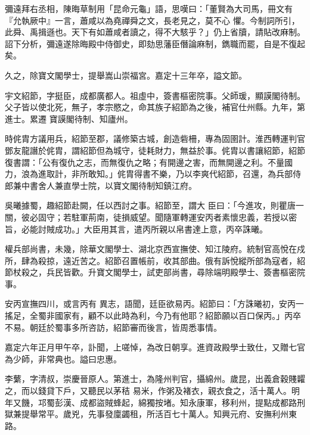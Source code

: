 \begin{pinyinscope}
 彌遠拜右丞相，陳晦草制用「昆命元龜」語，思嘆曰：「董賢為大司馬，冊文有『允執厥中』一言，蕭咸以為堯禪舜之文，長老見之，莫不心
 懼。今制詞所引，此舜、禹揖遜也。天下有如蕭咸者讀之，得不大駭乎？」仍上省牘，請貼改麻制。詔下分析，彌遠遂除晦殿中侍御史，即劾思藩臣僭論麻制，鐫職而罷，自是不復起矣。



 久之，除寶文閣學士，提舉嵩山崇福宮。嘉定十三年卒，謚文節。



 宇文紹節，字挺臣，成都廣都人。祖虛中，簽書樞密院事。父師瑗，顯謨閣待制。父子皆以使北死，無子，孝宗愍之，命其族子紹節為之後，補官仕州縣。九年，第進士。累遷
 寶謨閣待制、知廬州。



 時侂胄方議用兵，紹節至郡，議修築古城，創造砦柵，專為固圉計。淮西轉運判官鄧友龍譖於侂胄，謂紹節但為城守，徒耗財力，無益於事。侂胄以書讓紹節，紹節復書謂：「公有復仇之志，而無復仇之略；有開邊之害，而無開邊之利。不量國力，浪為進取計，非所敢知。」侂胄得書不樂，乃以李爽代紹節，召還，為兵部侍郎兼中書舍人兼直學士院，以寶文閣待制知鎮江府。



 吳曦據蜀，趣紹節赴闕，任以西討之事。紹節至，謂大
 臣曰：「今進攻，則瞿唐一關，彼必固守；若駐軍荊南，徒損威望。聞隨軍轉運安丙者素懷忠義，若授以密旨，必能討賊成功。」大臣用其言，遣丙所親以帛書達上意，丙卒誅曦。



 權兵部尚書，未幾，除華文閣學士、湖北京西宣撫使、知江陵府。統制官高悅在戍所，肆為殺掠，遠近苦之。紹節召置帳前，收其部曲。俄有訴悅縱所部為寇者，紹節杖殺之，兵民皆歡。升寶文閣學士，試吏部尚書，尋除端明殿學士、簽書樞密院事。



 安丙宣撫四川，或言丙有
 異志，語聞，廷臣欲易丙。紹節曰：「方誅曦初，安丙一搖足，全蜀非國家有，顧不以此時為利，今乃有他耶？紹節願以百口保丙。」丙卒不易。朝廷於蜀事多所咨訪，紹節審而後言，皆周悉事情。



 嘉定六年正月甲午卒，訃聞，上嗟悼，為改日朝享。進資政殿學士致仕，又贈七官為少師，非常典也。謚曰忠惠。



 李蘩，字清叔，崇慶晉原人。第進士，為隆州判官，攝綿州。歲昆，出義倉穀賤糶之，而以錢貸下戶，又聽民以茅秸
 易米，作粥及褚衣，親衣食之，活十萬人。明年又饑，邛蜀彭漢、成都盜賊蜂起，綿獨按堵。知永康軍，移利州，提點成都路刑獄兼提舉常平。歲兇，先事發廩蠲租，所活百七十萬人。知興元府、安撫利州東路。




\end{pinyinscope}
